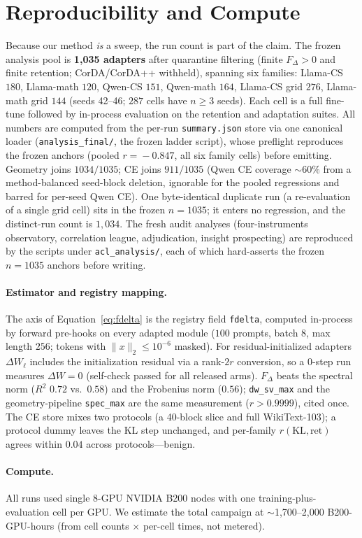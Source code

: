 \documentclass[11pt]{article}
\newcommand{\dw}{F_{\Delta}}
\begin{document}
\section{Reproducibility and Compute}\label{app:repro}
Because our method \emph{is} a sweep, the run count is part of the claim. The
frozen analysis pool is \textbf{1{,}035 adapters} after quarantine filtering
(finite $\dw\!>\!0$ and finite retention; CorDA/CorDA++ withheld), spanning six
families: Llama-CS $180$, Llama-math $120$, Qwen-CS $151$, Qwen-math $164$,
Llama-CS grid $276$, Llama-math grid $144$ (seeds 42--46; $287$ cells have
$n\!\ge\!3$ seeds). Each cell is a full fine-tune followed by in-process
evaluation on the retention and adaptation suites. All numbers are computed from
the per-run \texttt{summary.json} store via one canonical loader
(\texttt{analysis\_final/}, the frozen ladder script), whose preflight reproduces
the frozen anchors (pooled $r\!=\!-0.847$, all six family cells) before emitting.
Geometry joins $1034/1035$; CE joins $911/1035$ (Qwen CE coverage
$\sim\!60\%$ from a method-balanced seed-block deletion, ignorable for the pooled
regressions and barred for per-seed Qwen CE). One byte-identical duplicate run
(a re-evaluation of a single grid cell) sits in the frozen $n\!=\!1035$; it enters
no regression, and the distinct-run count is $1{,}034$. The fresh audit analyses
(four-instruments observatory, correlation league, adjudication, insight
prospecting) are reproduced by the scripts under \texttt{acl\_analysis/}, each of
which hard-asserts the frozen $n\!=\!1035$ anchors before writing.

\paragraph{Estimator and registry mapping.} The axis of Equation~\ref{eq:fdelta}
is the registry field \texttt{fdelta}, computed in-process by forward pre-hooks on
every adapted module ($100$ prompts, batch $8$, max length $256$; tokens with
$\lVert x\rVert_2 \le 10^{-6}$ masked). For residual-initialized adapters
$\Delta W_\ell$ includes the initialization residual via a rank-$2r$ conversion,
so a $0$-step run measures $\Delta W = 0$ (self-check passed for all released
arms). $\dw$ beats the spectral norm ($R^2$ $0.72$ vs.\ $0.58$) and the Frobenius
norm ($0.56$); \texttt{dw\_sv\_max} and the geometry-pipeline \texttt{spec\_max}
are the same measurement ($r\!>\!0.9999$), cited once. The CE store mixes two
protocols (a 40-block slice and full WikiText-103); a protocol dummy leaves the KL
step unchanged, and per-family $r(\text{KL},\text{ret})$ agrees within $0.04$
across protocols---benign.

\paragraph{Compute.} All runs used single 8-GPU NVIDIA B200 nodes with one
training-plus-evaluation cell per GPU. We estimate the total campaign at
$\sim$1{,}700--2{,}000 B200-GPU-hours (from cell counts $\times$ per-cell times,
not metered).
\end{document}
